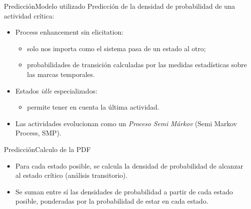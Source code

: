 \documentclass[9pt, handout]{beamer}
\begin{document}
      \begin{frame}{Predicción}{Modelo utilizado}
        \pause
        Predicción de la densidad de probabilidad de una actividad crítica:
        \pause
        \begin{itemize}
          \item Process enhancement sin elicitation:
          \begin{itemize}
            \item solo nos importa como el sistema pasa de un estado al otro;
            \item probabilidades de transición calculadas por las medidas estadísticas sobre las marcas temporales.
          \end{itemize}
          \pause
          \item Estados \textit{idle} especializados:
          \begin{itemize}
            \item permite tener en cuenta la última actividad.
          \end{itemize}
          \pause
          \item Las actividades evolucionan como un \textit{Proceso Semi Márkov} (Semi Markov Process, SMP).
        \end{itemize}
        
        \pause
      \end{frame}
      
      \begin{frame}{Predicción}{Calculo de la PDF}
        \pause
        \vspace{-1em}
        
      	\pause
      	\begin{itemize}
        	\item Para cada estado posible, se calcula la densidad de probabilidad de alcanzar al estado crítico (análisis transitorio).
        	\pause
        	\item Se suman entre sí las densidades de probabilidad a partir de cada estado posible, ponderadas por la probabilidad de estar en cada estado.
      	\end{itemize}
      	
      	\pause
      	\vspace{-0.5em}
      \end{frame}
      
\end{document}
